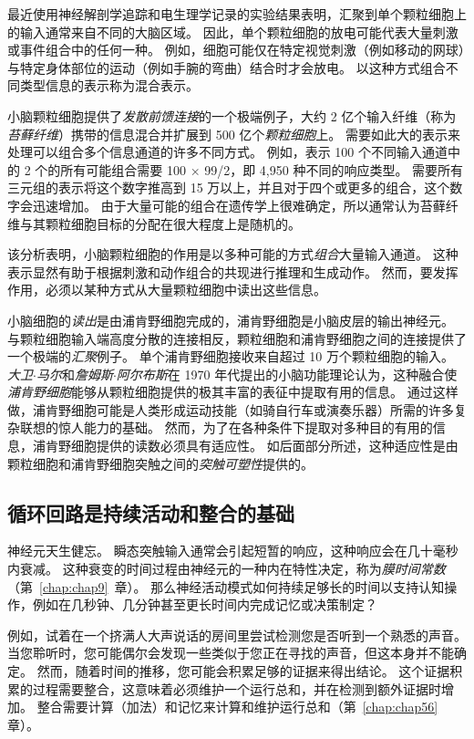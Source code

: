 最近使用神经解剖学追踪和电生理学记录的实验结果表明，汇聚到单个颗粒细胞上的输入通常来自不同的大脑区域。
因此，单个颗粒细胞的放电可能代表大量刺激或事件组合中的任何一种。
例如，细胞可能仅在特定视觉刺激（例如移动的网球）与特定身体部位的运动（例如手腕的弯曲）结合时才会放电。
以这种方式组合不同类型信息的表示称为混合表示。


小脑颗粒细胞提供了\textit{发散前馈连接}的一个极端例子，大约 2 亿个输入纤维（称为\textit{苔藓纤维}）携带的信息混合并扩展到 500 亿个\textit{颗粒细胞}上。
需要如此大的表示来处理可以组合多个信息通道的许多不同方式。
例如，表示 100 个不同输入通道中的 2 个的所有可能组合需要 100 × 99/2，即 4,950 种不同的响应类型。
需要所有三元组的表示将这个数字推高到 15 万以上，并且对于四个或更多的组合，这个数字会迅速增加。
由于大量可能的组合在遗传学上很难确定，所以通常认为苔藓纤维与其颗粒细胞目标的分配在很大程度上是随机的。


该分析表明，小脑颗粒细胞的作用是以多种可能的方式\textit{组合}大量输入通道。
这种表示显然有助于根据刺激和动作组合的共现进行推理和生成动作。
然而，要发挥作用，必须以某种方式从大量颗粒细胞中读出这些信息。


小脑细胞的\textit{读出}是由浦肯野细胞完成的，浦肯野细胞是小脑皮层的输出神经元。
与颗粒细胞输入端高度分散的连接相反，颗粒细胞和浦肯野细胞之间的连接提供了一个极端的\textit{汇聚}例子。
单个浦肯野细胞接收来自超过 10 万个颗粒细胞的输入。
\textit{大卫$\cdot$马尔}和\textit{詹姆斯$\cdot$阿尔布斯}在 1970 年代提出的小脑功能理论认为，这种融合使\textit{浦肯野细胞}能够从颗粒细胞提供的极其丰富的表征中提取有用的信息。
通过这样做，浦肯野细胞可能是人类形成运动技能（如骑自行车或演奏乐器）所需的许多复杂联想的惊人能力的基础。
然而，为了在各种条件下提取对多种目的有用的信息，浦肯野细胞提供的读数必须具有适应性。
如后面部分所述，这种适应性是由颗粒细胞和浦肯野细胞突触之间的\textit{突触可塑性}提供的。



\subsection{循环回路是持续活动和整合的基础}

神经元天生健忘。 
瞬态突触输入通常会引起短暂的响应，这种响应会在几十毫秒内衰减。
这种衰变的时间过程由神经元的一种内在特性决定，称为\textit{膜时间常数}（第~\ref{chap:chap9}~章）。
那么神经活动模式如何持续足够长的时间以支持认知操作，例如在几秒钟、几分钟甚至更长时间内完成记忆或决策制定？


例如，试着在一个挤满人大声说话的房间里尝试检测您是否听到一个熟悉的声音。
当您聆听时，您可能偶尔会发现一些类似于您正在寻找的声音，但这本身并不能确定。
然而，随着时间的推移，您可能会积累足够的证据来得出结论。
这个证据积累的过程需要整合，这意味着必须维护一个运行总和，并在检测到额外证据时增加。
整合需要计算（加法）和记忆来计算和维护运行总和（第~\ref{chap:chap56} 章）。


